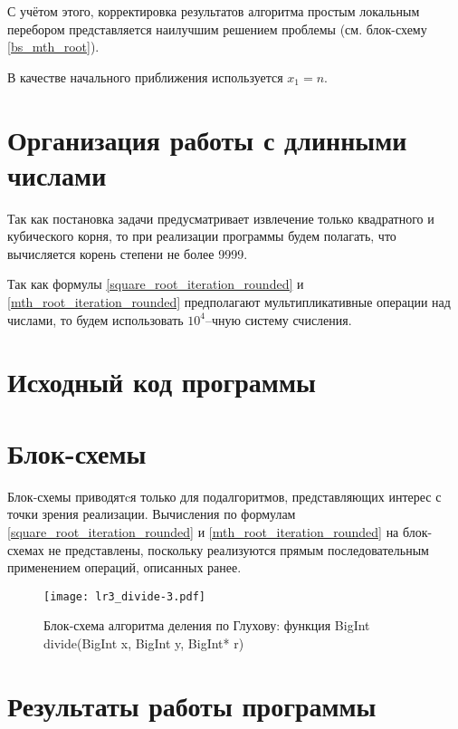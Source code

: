 \documentclass[a4paper,12pt]{article} %
\begin{document}
С учётом этого, корректировка результатов алгоритма простым локальным перебором
представляется наилучшим решением проблемы (см. блок-схему \ref{bs_mth_root}).

В качестве начального приближения используется $x_1=n$.

\section*{Организация работы с длинными числами}
Так как постановка задачи предусматривает извлечение только квадратного и кубического корня,
то при реализации программы будем полагать, что вычисляется корень степени не более 9999.

Так как формулы \eqref{square_root_iteration_rounded} и \eqref{mth_root_iteration_rounded}
предполагают мультипликативные операции над числами,
то будем использовать $10^4$--чную систему счисления.

\section*{Исходный код программы}







\section*{Блок-схемы}

Блок-схемы приводятcя только для подалгоритмов, представляющих интерес с точки зрения реализации.
Вычисления по формулам \eqref{square_root_iteration_rounded} и \eqref{mth_root_iteration_rounded}
на блок-схемах не представлены,
поскольку реализуются прямым последовательным применением операций, описанных ранее.


\begin{figure}[ht]
	\texttt{[image: lr3\_divide-3.pdf]}
	\caption{Блок-схема алгоритма деления по Глухову: функция BigInt divide(BigInt x, BigInt y, BigInt* r)}
\end{figure}


\clearpage

\section*{Результаты работы программы}
\end{document}
